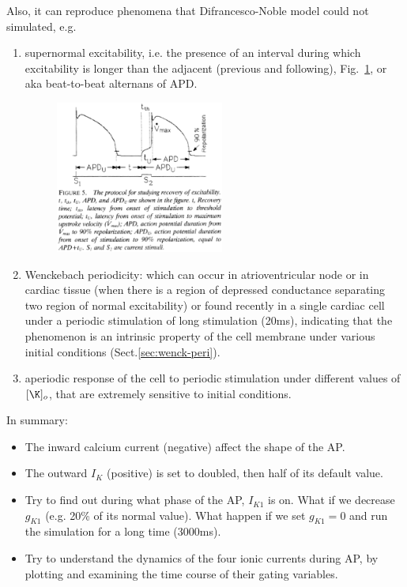 Also, it can reproduce phenomena that Difrancesco-Noble model could not
simulated, e.g.
\begin{enumerate}
\item supernormal excitability, i.e. the presence of an interval
  during which excitability is longer than the adjacent (previous and
  following), Fig.~\ref{fig:supernormal_excitability}, or aka
  beat-to-beat alternans of APD. 

\begin{figure}[hbt]
  \centerline{\includegraphics[height=5cm,
    angle=0]{./images/supernormal_excitability.eps}}
\caption{}
\label{fig:supernormal_excitability}
\end{figure}

\item Wenckebach periodicity: which can occur in atrioventricular node or in
  cardiac tissue (when there is a region of depressed conductance
  separating two region of normal excitability) or found recently in a single
  cardiac cell under a periodic stimulation of long stimulation (20ms),
  indicating that the phenomenon is an intrinsic property of the cell membrane
  under various initial  conditions (Sect.\ref{sec:wenck-peri}).

\item aperiodic response of the cell to periodic stimulation under
  different values of $[\K]_o$, that are extremely sensitive to
  initial conditions.
\end{enumerate}

In summary:
\begin{itemize}
\item The inward calcium current (negative) affect the shape of the
  AP.

\item The outward $I_K$ (positive) is set to doubled, then half of its
  default value.

\item Try to find out during what phase of the AP, $I_{K1}$ is
  on. What if we decrease $g_{K1}$ (e.g. 20\% of its normal
  value). What happen if we set $g_{K1}=0$ and run the simulation for
  a long time (3000ms).

\item Try to understand the dynamics of the four ionic currents during
  AP, by plotting and examining the time course of their gating
  variables.

\end{itemize}

